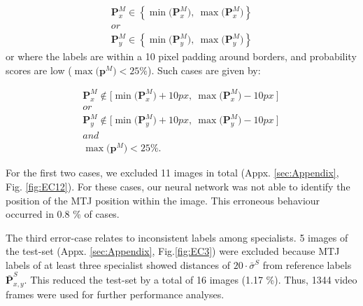 \documentclass[journal,twoside,web]{ieeecolor}
\begin{document}
\begin{equation}
\label{eq:errorcase1}
    \begin{gathered}
       \boldsymbol{P}^{M}_{x} \in \left\{\min{\big(\boldsymbol{P}^{M}_{x}}\big), \ \max{(\boldsymbol{P}^{M}_{x}\big)}\right\} 
       \\ or \\
      \boldsymbol{P}^{M}_{y} \in \left\{\min{\big(\boldsymbol{P}^{M}_{y}}\big), \ \max{(\boldsymbol{P}^{M}_{y}\big)}\right\}
    \end{gathered}
\end{equation}
or where the labels are within a 10 pixel padding around borders, and probability scores are low ($\max\big(\boldsymbol{p}^{M}\big)<25\%$). Such cases are given by:

\begin{equation}
\label{eq:errorcase2}
    \begin{gathered}
    \boldsymbol{P}^{M}_{x} \notin \Big[
        \min{\big(\boldsymbol{P}^{M}_{x}}\big) + 10px, \: \max{\big(\boldsymbol{P}^{M}_{x}\big) - 10px}\ \Big]\ 
       \\ or \\
        \boldsymbol{P}^{M}_{y} \notin \Big[\min{\big(\boldsymbol{P}^{M}_{y}}\big) + 10px, \: \max{\big(\boldsymbol{P}^{M}_{y}\big) - 10px}\
      \Big]
      \\ and \\
      \max\big(\boldsymbol{p}^{M}\big)<25\% .
    \end{gathered}
\end{equation}
\vspace{0.8cm}

For the first two cases, we excluded 11 images in total (Appx. \ref{sec:Appendix}, Fig. \ref{fig:EC12}). For these cases, our neural network was not able to identify the position of the MTJ position within the image. This erroneous behaviour occurred in 0.8 \% of cases.

The third error-case relates to inconsistent labels among specialists. 5 images of the test-set (Appx. \ref{sec:Appendix}, Fig.\ref{fig:EC3}) were excluded because MTJ labels of at least three specialist showed distances of $20 \cdot \bar{\sigma}^{S}$ from reference labels $\bar{\boldsymbol{P}}^{S}_{x,y}$. This reduced the test-set by a total of 16 images (1.17 \%). Thus, 1344 video frames were used for further performance analyses.

\vspace{0.1cm}
\end{document}

